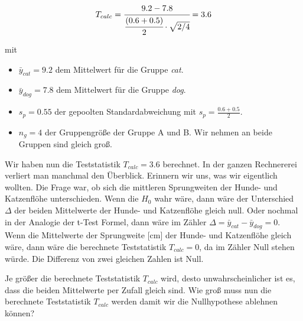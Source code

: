 \documentclass[
  letterpaper,
  DIV=11,
  oneside]{scrreport}
\providecommand{\tightlist}{%
  \setlength{\itemsep}{0pt}\setlength{\parskip}{0pt}}\usepackage{longtable,booktabs,array}
\begin{document}
\[
T_{calc}=\cfrac{9.2 - 7.8}{\cfrac{(0.6 + 0.5)}{2} \cdot \sqrt{2/4}} = 3.6
\]

mit

\begin{itemize}
\tightlist
\item
  \(\bar{y}_{cat} = 9.2\) dem Mittelwert für die Gruppe \emph{cat}.
\item
  \(\bar{y}_{dog} = 7.8\) dem Mittelwert für die Gruppe \emph{dog}.
\item
  \(s_p = 0.55\) der gepoolten Standardabweichung mit
  \(s_p = \tfrac{0.6 + 0.5}{2}\).
\item
  \(n_g = 4\) der Gruppengröße der Gruppe A und B. Wir nehmen an beide
  Gruppen sind gleich groß.
\end{itemize}

Wir haben nun die Teststatistik \(T_{calc} = 3.6\) berechnet. In der
ganzen Rechnererei verliert man manchmal den Überblick. Erinnern wir
uns, was wir eigentlich wollten. Die Frage war, ob sich die mittleren
Sprungweiten der Hunde- und Katzenflöhe unterschieden. Wenn die \(H_0\)
wahr wäre, dann wäre der Unterschied \(\Delta\) der beiden Mittelwerte
der Hunde- und Katzenflöhe gleich null. Oder nochmal in der Analogie der
t-Test Formel, dann wäre im Zähler
\(\Delta = \bar{y}_{cat} - \bar{y}_{dog} = 0\). Wenn die Mittelwerte der
Sprungweite {[}cm{]} der Hunde- und Katzenflöhe gleich wäre, dann wäre
die berechnete Teststatistik \(T_{calc} = 0\), da im Zähler Null stehen
würde. Die Differenz von zwei gleichen Zahlen ist Null.

Je größer die berechnete Teststatistik \(T_{calc}\) wird, desto
unwahrscheinlicher ist es, dass die beiden Mittelwerte per Zufall gleich
sind. Wie groß muss nun die berechnete Teststatistik \(T_{calc}\) werden
damit wir die Nullhypothese ablehnen können?
\end{document}

